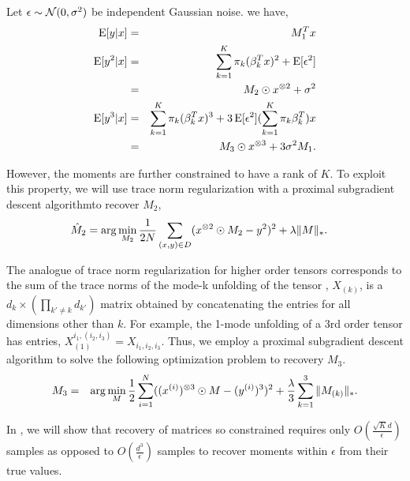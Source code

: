 Let $\epsilon \sim \mathcal{N}(0, \sigma^2)$ be independent Gaussian noise.
we have,
\begin{eqnarray*}
  \operatorname{E}[ y | x ] &=& M_1^T x \\
  \operatorname{E}[ y^2 | x ] &=& \sum_{k=1}^{K} \pi_{k} (\beta_k^T x)^2 + \operatorname{E}[ \epsilon^2 ] \\
  &=& M_2 \odot x^{\otimes 2} + \sigma^2 \\
  \operatorname{E}[ y^3 | x ] &=& \sum_{k=1}^{K} \pi_{k} (\beta_k^T x)^3
            + 3 \operatorname{E}[\epsilon^2] (\sum_{k=1}^{K} \pi_{k} \beta_k^T) x \\
  &=& M_3 \odot x^{\otimes 3} + 3 \sigma^2 M_1.
\end{eqnarray*}

However, the moments are further constrained to have
a rank of $K$. To exploit this property, we will use trace norm
regularization with a proximal subgradient descent
algorithm\citationneeded to recover $M_2$,
\begin{align}
  \hat M_2 &= \arg\min_{M_2} \frac{1}{2 N} \sum_{(x,y) \in D} (x^{\otimes 2} \odot M_2 - y^2)^2 + \lambda \|M\|_*.
\end{align}

The analogue of trace norm regularization for higher order tensors
corresponds to the sum of the trace norms of the mode-k unfolding of the
tensor \cite{Tomioka2011}, $X_{(k)}$, is a $d_k \times (\prod_{k' \neq
k} d_{k'})$ matrix obtained by concatenating the entries for all
dimensions other than $k$. For example, the 1-mode unfolding of a 3rd
order tensor has entries, $X_{(1)}^{i_1, (i_2, i_3)} = X_{i_1, i_2,
i_3}$. Thus, we employ a proximal subgradient descent algorithm to solve
the following optimization problem to recovery $M_3$.
\begin{eqnarray*}
  M_3 &=& \arg\min_{M} \frac{1}{2} \sum_{i=1}^N ((x^{(i)})^{\otimes 3} \odot M - (y^{(i)})^3)^2 
          + \frac{\lambda}{3} \sum_{k=1}^{3} \|M_{(k)}\|_*.
\end{eqnarray*}

In , we will show that recovery of matrices so
constrained requires only $O(\frac{\sqrt{K} d}{\epsilon})$ samples as
opposed to $O(\frac{d^3}{\epsilon})$ samples to recover moments within
$\epsilon$ from their true values.

